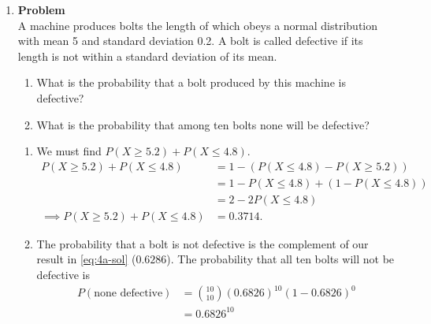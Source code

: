 \documentclass[12pt]{article}
\newenvironment{Ex}{\textbf{Problem}\vspace{.75em}\\}{}
\begin{document}
\begin{enumerate}
\begin{Ex}
\begin{solution}
\begin{enumerate}
\begin{equation}
\begin{aligned}
            \implies P\left(\frac{1}{2} < X < \frac{2}{3}\right) &=
            0.0417.
          \end{aligned}
        \end{equation}
      \end{enumerate}
    \end{solution}
  \end{Ex}
  \pagebreak[4]
\item
  \begin{Ex}
    A machine produces bolts the length of which obeys a normal
    distribution with mean 5 and standard deviation 0.2. A bolt is
    called defective if its length is not within a standard deviation
    of its mean.
    \begin{enumerate}
    \item What is the probability that a bolt produced by this machine
      is defective?
    \item What is the probability that among ten bolts none will be
      defective?
    \end{enumerate}
    \begin{solution} \hfill
      \begin{enumerate}
      \item We must find $P(X \ge 5.2) + P(X \le 4.8)$.
        \begin{equation}
          \label{eq:4a-sol}
          \begin{aligned}
            P(X \ge 5.2) + P(X \le 4.8) &= 1-(P(X \le 4.8) - P(X \ge
            5.2)) \\
            &= 1-P(X \le 4.8) + (1-P(X \le 4.8)) \\
            &= 2-2P(X \le 4.8) \\
            \implies P(X \ge 5.2) + P(X \le 4.8) &= 0.3714.
          \end{aligned}
        \end{equation}
      \item The probability that a bolt is not defective is the
        complement of our result in \cref{eq:4a-sol} ($0.6286$). The
        probability that all ten bolts will not be defective is
        \begin{equation}
          \label{eq:4b-sol}
          \begin{aligned}
            P(\text{none defective}) &= {10 \choose
              10}(0.6826)^{10}(1-0.6826)^0 \\
            &= 0.6826^{10} \\

\end{aligned}
\end{equation}
\end{enumerate}
\end{solution}
\end{Ex}
\end{enumerate}
\end{document}
